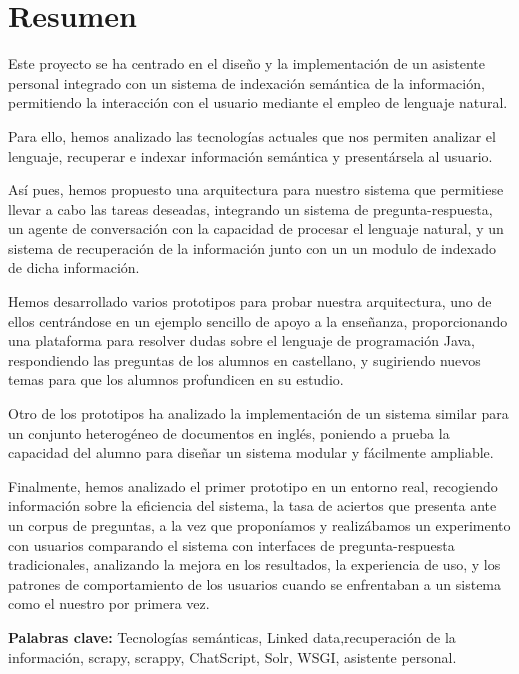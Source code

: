 \cleardoublepage
{}
\chapter*{Resumen}

Este proyecto se ha centrado en el diseño y la implementación de un asistente personal integrado con un sistema de indexación semántica de la información, permitiendo la interacción con el usuario mediante el empleo de lenguaje natural.

Para ello, hemos analizado las tecnologías actuales que nos permiten analizar el lenguaje, recuperar e indexar información semántica y presentársela al usuario.

Así pues, hemos propuesto una arquitectura para nuestro sistema que permitiese llevar a cabo las tareas deseadas, integrando un sistema de pregunta-respuesta, un agente de conversación con la capacidad de procesar el lenguaje natural, y un sistema de recuperación de la información junto con un un modulo de indexado de dicha información.

Hemos desarrollado varios prototipos para probar nuestra arquitectura, uno de ellos centrándose en un ejemplo sencillo de apoyo a la enseñanza, proporcionando una plataforma para resolver dudas sobre el lenguaje de programación Java, respondiendo las preguntas de los alumnos en castellano, y sugiriendo nuevos temas para que los alumnos profundicen en su estudio.

Otro de los prototipos ha analizado la implementación de un sistema similar para un conjunto heterogéneo de documentos en inglés, poniendo a prueba la capacidad del alumno para diseñar un sistema modular y fácilmente ampliable.

Finalmente, hemos analizado el primer prototipo en un entorno real, recogiendo información sobre la eficiencia del sistema, la tasa de aciertos que presenta ante un corpus de preguntas, a la vez que proponíamos y realizábamos un experimento con usuarios comparando el sistema con interfaces de pregunta-respuesta tradicionales, analizando la mejora en los resultados, la experiencia de uso, y los patrones de comportamiento de los usuarios cuando se enfrentaban a un sistema como el nuestro por primera vez.

\vfill
\textbf{Palabras clave:} Tecnologías semánticas, Linked data,recuperación de la información, scrapy, scrappy, ChatScript, Solr, WSGI, asistente personal.